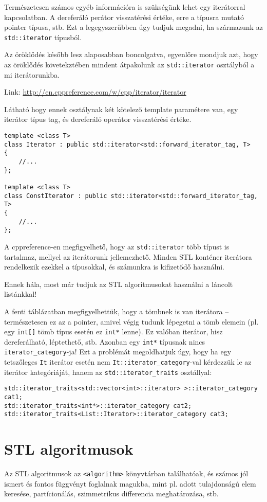 \documentclass[a4paper,11.5pt,table]{article}
\begin{document}
	\smallskip
	Természetesen számos egyéb információra is szükségünk lehet egy iterátorral kapcsolatban. A dereferáló perátor visszatérési értéke, erre a típusra mutató pointer típusa, stb. Ezt a legegyszerűbben úgy tudjuk megadni, ha származunk az \texttt{std::iterator} típusból.
	\begin{note}
		Az öröklődés később lesz alaposabban boncolgatva, egyenlőre mondjuk azt, hogy az öröklődés követekztében mindent átpakolunk az \texttt{std::iterator} osztályból a mi iterátorunkba.
	\end{note}
	
	Link: \url{http://en.cppreference.com/w/cpp/iterator/iterator}
	\smallskip
	
	Látható hogy ennek osztálynak két kötelező template paramétere van, egy iterátor típus tag, és dereferáló operátor visszatérési értéke.
	
	\begin{lstlisting}
template <class T>
class Iterator : public std::iterator<std::forward_iterator_tag, T>
{
	//...
};

template <class T>
class ConstIterator : public std::iterator<std::forward_iterator_tag, T>
{
	//...
};
	\end{lstlisting}
	A cppreference-en megfigyelhető, hogy az \texttt{std::iterator} több típust is tartalmaz, mellyel az iterátorunk jellemezhető. Minden STL konténer iterátora rendelkezik ezekkel a típusokkal, és számunkra is kifizetődő használni.
	
	\smallskip
	Ennek hála, most már tudjuk az STL algoritmusokat használni a láncolt listánkkal!
	
	\smallskip
	A fenti táblázatban megfigyelhettük, hogy a tömbnek is van iterátora -- természetesen ez az a pointer, amivel végig tudunk lépegetni a tömb elemein (pl. egy \texttt{int[]} tömb típus esetén ez \texttt{int*} lenne). Ez valóban iterátor, hisz dereferálható, léptethető, stb. Azonban egy \texttt{int*} típusnak nincs \texttt{iterator\_category}-ja! Ezt a problémát megoldhatjuk úgy, hogy ha egy tetszőleges \texttt{It} iterátor esetén nem \texttt{It::iterator\_category}-val kérdezzük le az iterátor kategóriáját, hanem az \texttt{std::iterator\_traits} osztállyal:
	\begin{lstlisting}
std::iterator_traits<std::vector<int>::iterator> >::iterator_category cat1;
std::iterator_traits<int*>::iterator_category cat2;
std::iterator_traits<List::Iterator>::iterator_category cat3;
	\end{lstlisting}
	\section{STL algoritmusok}
	Az STL algoritmusok az \texttt{<algorithm>} könyvtárban találhatóak, és számos jól ismert és fontos függvényt foglalnak magukba, mint pl. adott tulajdonságú elem keresése, partícionálás, szimmetrikus differencia meghatározása, stb.
	
\end{document}
